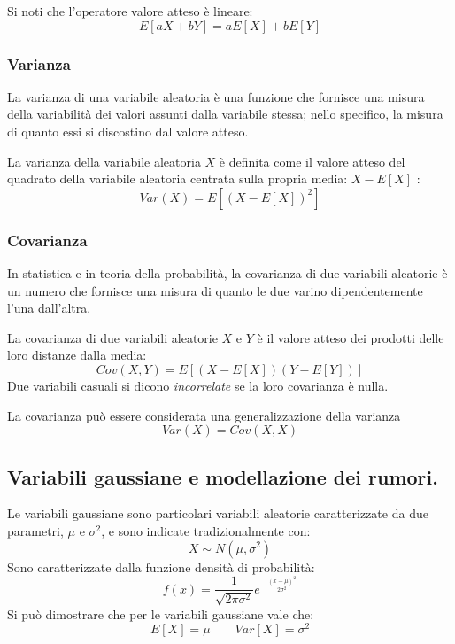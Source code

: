 \noindent  Si noti che l'operatore valore atteso è lineare:
\begin{equation}
E[aX + bY] = aE[X] + bE[Y]
\end{equation}




\subsubsection{Varianza}

La varianza di una variabile aleatoria è una funzione che fornisce una misura della variabilità dei valori assunti dalla variabile stessa; nello specifico, la misura di quanto essi si discostino dal valore atteso.

La varianza della variabile aleatoria $X$ è definita come il valore atteso del quadrato della variabile aleatoria centrata sulla propria media: $X - E[X]$ :
\begin{equation}
Var(X) = E[(X - E[X])^2]
\end{equation}

\subsubsection{Covarianza}

In statistica e in teoria della probabilità, la covarianza di due variabili aleatorie è un numero che fornisce una misura di quanto le due varino dipendentemente l'una dall'altra.

La covarianza di due variabili aleatorie $X$ e $Y$ è il valore atteso dei prodotti delle loro distanze dalla media: \begin{equation}
Cov(X,Y)= E [(X-E[X])(Y-E[Y])]
\end{equation}
Due variabili casuali si dicono \textit{incorrelate} se la loro covarianza è nulla.

La covarianza può essere considerata una generalizzazione della varianza 
\begin{equation}
Var(X) = Cov(X,X)
\end{equation}

\subsection{Variabili gaussiane e modellazione dei rumori.}

Le variabili gaussiane sono particolari variabili aleatorie caratterizzate da due parametri, $\mu$ e $\sigma^2$, e sono indicate tradizionalmente con: 
\begin{equation}
X \sim N(\mu ,\sigma^2)
\end{equation}
Sono caratterizzate dalla funzione densità di probabilità: 
\begin{equation}
f(x) = \frac{1}{\sqrt {2\pi\sigma^2}}e^{-\frac{(x-\mu)^2}{2\sigma^2}}
\end{equation}
Si può dimostrare che per le variabili gaussiane vale che: 
\begin{equation}
E[X]= \mu \qquad Var[X]= \sigma^2
\end{equation}

